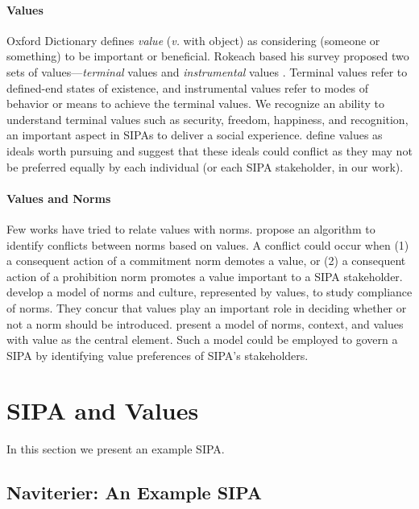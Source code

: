\documentclass[11pt,          %
               phd,           %
               onehalfspacing %
               ]{ncsuthesis}
\newcommand{\fsl}{\textsl}
\newcommand{\navigationapp}{Naviterier\xspace}
\begin{document}
\paragraph*{Values}
Oxford Dictionary defines \fsl{value} (\emph{v.} with object) as
considering (someone or something) to be important or beneficial.
Rokeach based his survey proposed two sets of values---\fsl{terminal}
values and \fsl{instrumental} values \citep{rokeach1973nature}. Terminal
values refer to defined-end states of existence, and instrumental values
refer to modes of behavior or means to achieve the terminal values. We
recognize an ability to understand terminal values such as security,
freedom, happiness, and recognition, an important aspect in SIPAs to
deliver a social experience. \cite{Dechesne-AIL13-Norms+Values} define
values as ideals worth pursuing and suggest that these ideals could
conflict as they may not be preferred equally by each individual (or
each SIPA stakeholder, in our work).

\paragraph*{Values and Norms}
Few works have tried to relate values with norms.
\citet{DaSilvaFigueiredo-COIN13} propose an algorithm to identify
conflicts between norms based on values. A conflict could occur when (1)
a consequent action of a commitment norm demotes a value, or (2) a
consequent action of a prohibition norm promotes a value important to a
SIPA stakeholder. \citet{Dechesne-AIL13-Norms+Values} develop a 
model of norms and culture, represented by values, to study compliance of norms.  
They concur that values play an important role in deciding whether or 
not a norm should be introduced. \citet{kayal13coin} present a model 
of norms, context, and values with value as the central element. Such 
a model could be employed to govern a SIPA by identifying value 
preferences of SIPA's stakeholders. 

\section{SIPA and Values}

In this section we present an example SIPA.

\subsection*{\navigationapp: An Example SIPA}
\end{document}
